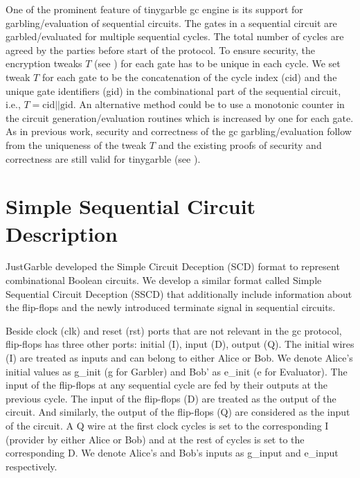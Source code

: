 One of the prominent feature of \gls{tinygarble} \acrshort{gc} engine is its support for garbling/evaluation of sequential circuits.
The gates in a sequential circuit are garbled/evaluated for multiple sequential cycles.
The total number of cycles are agreed by the parties before start of the protocol.
To ensure security, the encryption tweaks $T$ (see ) for each gate has to be unique in each cycle\cite[Sect. 3.4]{henecka2013faster}.
We set tweak $T$ for each gate to be the concatenation of the cycle index (cid) and the unique gate identifiers (gid) in the combinational part of the sequential circuit, i.e., $T = \textrm{cid} || \textrm{gid}$.
An alternative method could be to use a monotonic counter in the circuit generation/evaluation routines which is increased by one for each gate.
As in previous work, security and correctness of the \acrshort{gc} garbling/evaluation follow from the uniqueness of the tweak $T$ and the existing proofs of security and correctness are still valid for \gls{tinygarble} (see \cite{lindell2009proof, bellare2013efficient, zahur2015two}).


\section{Simple Sequential Circuit Description}\label{sec:engine-sscd}
JustGarble \cite{bellare2013efficient} developed the Simple Circuit Deception (SCD) format to represent combinational Boolean circuits.
We develop a similar format called Simple Sequential Circuit Deception (SSCD) that additionally include information about the flip-flops and the newly introduced terminate signal in sequential circuits.

Beside clock (clk) and reset (rst) ports that are not relevant in the \acrshort{gc} protocol, flip-flops has three other ports: initial (I), input (D), output (Q).
The initial wires (I) are treated as inputs and can belong to either Alice or Bob.
We denote Alice's initial values as g\_init (g for Garbler) and Bob' as e\_init (e for Evaluator).
The input of the flip-flops at any sequential cycle are fed by their outputs at the previous cycle.
The input of the flip-flops (D) are treated  as the output of the circuit.
And similarly, the output of the flip-flops (Q) are considered as the input of the circuit.  
A Q wire at the first clock cycles is set to the corresponding I (provider by either Alice or Bob) and at the rest of cycles is set to the corresponding D.
We denote Alice's and Bob's inputs as g\_input and e\_input respectively.

